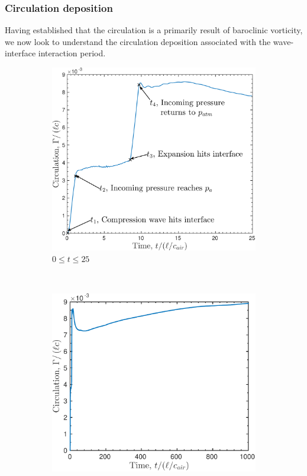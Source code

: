 \subsubsection{Circulation deposition}
Having established that the circulation is a primarily result of
baroclinic vorticity, we now look to understand the circulation
deposition associated with the wave-interface interaction period.
%
\begin{figure}
  \centering
  \begin{subfigure}[b]{0.48\textwidth}
    \centering
    \includegraphics[width=\textwidth]{./figs/lung_figs/trapz10_circ_schematic.pdf}
    \caption{\label{fig:trapz10_circ_schematic_t25} $0\leq t \leq 25$ }
  \end{subfigure}
  ~
  \begin{subfigure}[b]{0.48\textwidth}
    \centering
    \includegraphics[width=\textwidth]{./figs/lung_figs/Gamma_t1000_28-Oct-2016.pdf}

\end{subfigure}
\end{figure}
